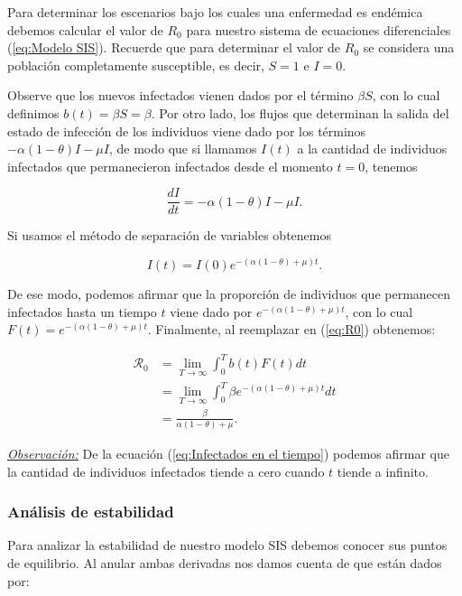 Para determinar los escenarios bajo los cuales una enfermedad es endémica debemos calcular el valor de $R_0$ para nuestro sistema de ecuaciones diferenciales (\ref{eq:Modelo SIS}). Recuerde que para determinar el valor de $R_0$ se considera una población completamente susceptible, es decir, $S=1$ e $I=0$.

Observe que los nuevos infectados vienen dados por el término $\beta S$, con lo cual definimos $b(t) = \beta S = \beta$. Por otro lado, los flujos que determinan la salida del estado de infección de los individuos viene dado por los términos $-\alpha(1-\theta)I-\mu I$, de modo que si llamamos $I(t)$ a la cantidad de individuos infectados que permanecieron infectados desde el momento $t=0$, tenemos

\begin{equation}\label{eq:Cambio en I}
\frac{dI}{dt} = -\alpha(1-\theta)I-\mu I.
\end{equation}

Si usamos el método de separación de variables obtenemos

\begin{equation}\label{eq:Infectados en el tiempo}
I(t) = I(0)e^{-(\alpha(1-\theta)+\mu)t}.
\end{equation}

De ese modo, podemos afirmar que la proporción de individuos que permanecen infectados hasta un tiempo $t$ viene dado por $e^{-(\alpha(1-\theta)+\mu)t}$, con lo cual $F(t)=e^{-(\alpha(1-\theta)+\mu)t}$. Finalmente, al reemplazar en (\ref{eq:R0}) obtenemos:

\begin{align*}
\mathcal{R}_0 &= \lim_{T\to\infty}\int_0^T b(t)F(t) dt \\
&= \lim_{T\to\infty}\int_0^T \beta e^{-(\alpha(1-\theta)+\mu)t} dt\\
&= \frac{\beta}{\alpha(1-\theta)+\mu}.
\end{align*}

\underline{\textit{Observación:}} De la ecuación (\ref{eq:Infectados en el tiempo}) podemos afirmar que la cantidad de individuos infectados tiende a cero cuando $t$ tiende a infinito.

\subsubsection{Análisis de estabilidad}

Para analizar la estabilidad de nuestro modelo SIS debemos conocer sus puntos de equilibrio. Al anular ambas derivadas nos damos cuenta de que están dados por:

